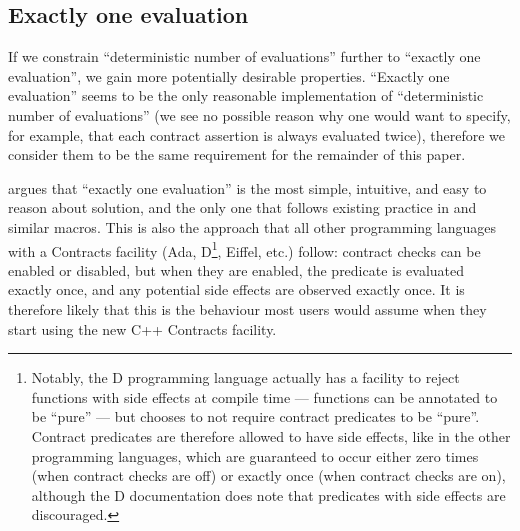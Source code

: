 \subsection{Exactly one evaluation}

If we constrain ``deterministic number of evaluations'' further to ``exactly one evaluation'', we gain more potentially desirable properties. ``Exactly one evaluation'' seems to be the only reasonable implementation of ``deterministic number of evaluations'' (we see no possible reason why one would want to specify, for example, that each contract assertion is always evaluated twice), therefore we consider them to be the same requirement for the remainder of this paper.

\cite{P2756R0} argues that ``exactly one evaluation'' is the most simple, intuitive, and easy to reason about solution, and the only one that follows existing practice in  and similar macros. This is also the approach that all other programming languages with a Contracts facility (Ada, D\footnote{Notably, the D programming language actually has a facility to reject functions with side effects at compile time --- functions can be annotated to be ``pure'' --- but chooses to not require contract predicates to be ``pure''. Contract predicates are therefore allowed to have side effects, like in the other programming languages, which are guaranteed to occur either zero times (when contract checks are off) or exactly once (when contract checks are on), although the D documentation does note that predicates with side effects are discouraged.}, Eiffel, etc.) follow: contract checks can be enabled or disabled, but when they are enabled, the predicate is evaluated exactly once, and any potential side effects are observed exactly once. It is therefore likely that this is the behaviour most users would assume when they start using the new C++ Contracts facility.

